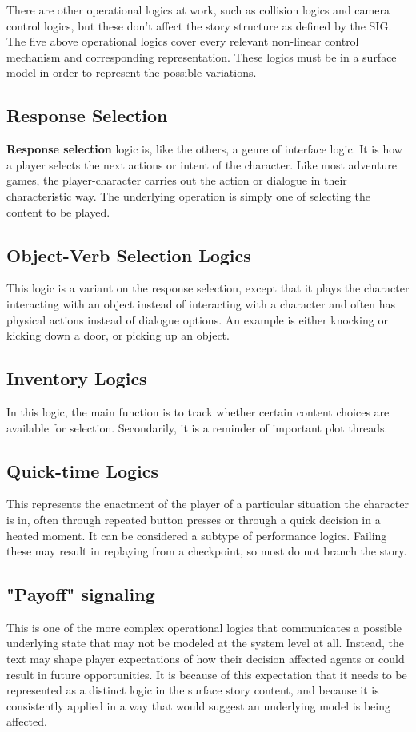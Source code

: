 \documentclass{llncs}
\begin{document}
There are other operational logics at work, such as collision logics
and camera control logics, but these don't affect the story structure
as defined by the SIG. The five above operational logics cover every
relevant non-linear control mechanism and corresponding
representation. These logics must be in a surface model in order to
represent the possible variations. 

\subsection*{Response Selection}
\label{sec:orgheadline4}
\textbf{Response selection} logic is, like the others, a genre of interface
logic. It is how a player selects the next actions or intent of the
character. Like most adventure games, the player-character carries out
the action or dialogue in their characteristic way. The underlying
operation is simply one of selecting the content to be played.

\subsection*{Object-Verb Selection Logics}
\label{sec:orgheadline5}
This logic is a variant on the response selection, except that it
plays the character interacting with an object instead of interacting
with a character and often has physical actions instead of dialogue
options. An example is either knocking or kicking down a door, or
picking up an object.

\subsection*{Inventory Logics}
\label{sec:orgheadline6}
In this logic, the main function is to track whether certain content
choices are available for selection. Secondarily, it is a reminder of
important plot threads.
\subsection*{Quick-time Logics}
\label{sec:orgheadline7}
This represents the enactment of the player of a particular situation
the character is in, often through repeated button presses or through
a quick decision in a heated moment. It can be considered a subtype of
performance logics. Failing these may result in replaying from a
checkpoint, so most do not branch the story.
\subsection*{"Payoff" signaling}
\label{sec:orgheadline8}
This is one of the more complex operational logics that communicates a
possible underlying state that may not be modeled at the system level
at all. Instead, the text may shape player expectations of how their
decision affected agents or could result in future opportunities. It
is because of this expectation that it needs to be represented as a
distinct logic in the surface story content, and because it is
consistently applied in a way that would suggest an underlying model
is being affected.
\end{document}
